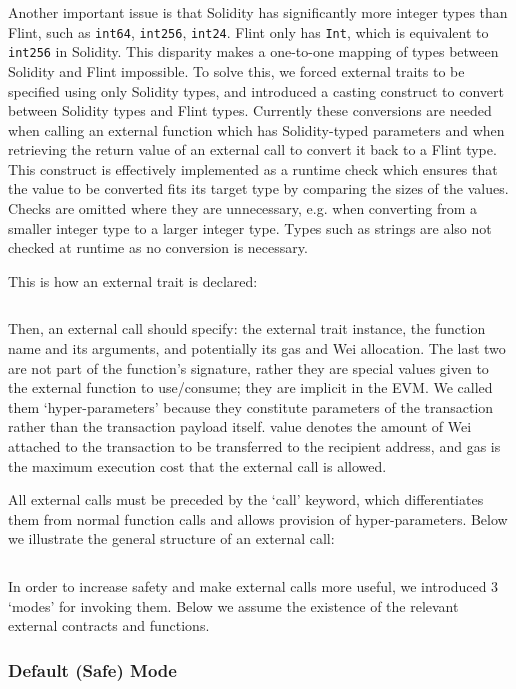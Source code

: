 Another important issue is that Solidity has significantly more integer types than Flint, such as \texttt{int64}, \texttt{int256}, \texttt{int24}. Flint only has \texttt{Int}, which is equivalent to \texttt{int256} in Solidity. This disparity makes a one-to-one mapping of types between Solidity and Flint impossible. To solve this, we forced external traits to be specified using only Solidity types, and introduced a casting construct to convert between Solidity types and Flint types. Currently these conversions are needed when calling an external function which has Solidity-typed parameters and when retrieving the return value of an external call to convert it back to a Flint type. This construct is effectively implemented as a runtime check which ensures that the value to be converted fits its target type by comparing the sizes of the values. Checks are omitted where they are unnecessary, e.g. when converting from a smaller integer type to a larger integer type. Types such as strings are also not checked at runtime as no conversion is necessary.

This is how an external trait is declared:

\inputminted{swift}{code/external-trait.flint}

Then, an external call should specify: the external trait instance, the function name and its arguments, and potentially its gas and Wei allocation. The last two are not part of the function’s signature, rather they are special values given to the external function to use/consume; they are implicit in the EVM. We called them `hyper-parameters' because they constitute parameters of the transaction rather than the transaction payload itself. value denotes the amount of Wei attached to the transaction to be transferred to the recipient address, and gas is the maximum execution cost that the external call is allowed.

All external calls must be preceded by the `call' keyword, which differentiates them from normal function calls and allows provision of hyper-parameters. Below we illustrate the general structure of an external call:

\inputminted{swift}{code/xcall-1.flint}

In order to increase safety and make external calls more useful, we introduced 3 `modes' for invoking them. Below we assume the existence of the relevant external contracts and functions.

\subsubsection{Default (Safe) Mode}

